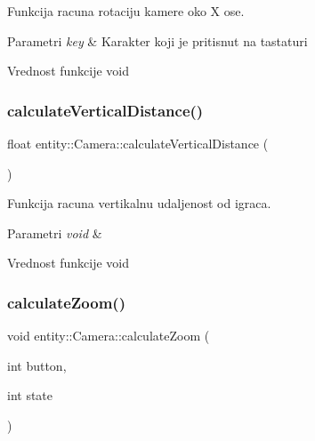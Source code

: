 Funkcija racuna rotaciju kamere oko X ose. 


\begin{DoxyParams}{Parametri}
{\em key} & Karakter koji je pritisnut na tastaturi \\
\hline
\end{DoxyParams}
\begin{DoxyReturn}{Vrednost funkcije}
void 
\end{DoxyReturn}
\mbox{\label{classentity_1_1Camera_a0662170fb43e41f529f4e2932a591858}} 
\subsubsection{\texorpdfstring{calculate\+Vertical\+Distance()}{calculateVerticalDistance()}}
{\footnotesize\ttfamily float entity\+::\+Camera\+::calculate\+Vertical\+Distance (\begin{DoxyParamCaption}{ }\end{DoxyParamCaption})\hspace{0.3cm}{\ttfamily [private]}}



Funkcija racuna vertikalnu udaljenost od igraca. 


\begin{DoxyParams}{Parametri}
{\em void} & \\
\hline
\end{DoxyParams}
\begin{DoxyReturn}{Vrednost funkcije}
void 
\end{DoxyReturn}
\mbox{\label{classentity_1_1Camera_a7d7bed8b571309039bcfc6cbe2c829de}} 
\subsubsection{\texorpdfstring{calculate\+Zoom()}{calculateZoom()}}
{\footnotesize\ttfamily void entity\+::\+Camera\+::calculate\+Zoom (\begin{DoxyParamCaption}\item[{int}]{button,  }\item[{int}]{state }\end{DoxyParamCaption})\hspace{0.3cm}{\ttfamily [private]}}



